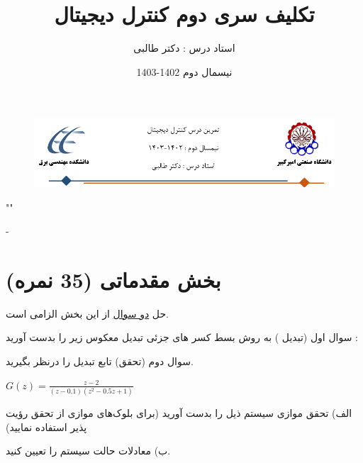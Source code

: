 \documentclass{article}
\title{تکلیف سری دوم کنترل دیجیتال}
\date{نیسمال دوم 1402-1403}
\author{استاد درس : دکتر طالبی}
\begin{document}
\markboth{\theauthor}{\thetitle}



\begin{figure}[htbp]
    \centering
    \includegraphics[width=\linewidth]{Header.png}
\end{figure}

\centering
""

-

\raggedleft
\section{بخش مقدماتی (35 نمره)}
\centering
حل \underline{دو سوال} از این بخش الزامی است.


    \begin{problem}{سوال اول}
    (تبدیل ) به روش بسط کسر های جزئی تبدیل معکوس  زیر را بدست آورید :
    
    \centering
    
    \end{problem}

    \begin{problem}{سوال دوم}
    	(تحقق) تابع تبدیل 
    	 را درنظر بگیرید.
    	 
    	 \centering
    	 $G(z) = \frac{z-2}{(z-0.1)(z^2-0.5z+1)}$
    	 
    	 \raggedright
    	 الف) تحقق موازی سیستم ذیل را بدست آورید (برای بلوک‌های موازی از تحقق رؤیت پذیر استفاده نمایید)
    	 
    	 ب) معادلات حالت سیستم را تعیین کنید.
    	 
    \end{problem}
    
\end{document}
